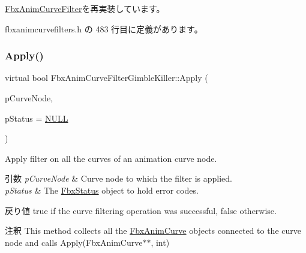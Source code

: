 \hyperlink{class_fbx_anim_curve_filter_a009498a65af4995bf5e5908f17837531}{Fbx\+Anim\+Curve\+Filter}を再実装しています。



 fbxanimcurvefilters.\+h の 483 行目に定義があります。

\mbox{\label{class_fbx_anim_curve_filter_gimble_killer_adb147695af2818ccc71e245170d05e78}} 
\subsubsection{\texorpdfstring{Apply()}{Apply()}\hspace{0.1cm}{\footnotesize\ttfamily [3/5]}}
{\footnotesize\ttfamily virtual bool Fbx\+Anim\+Curve\+Filter\+Gimble\+Killer\+::\+Apply (\begin{DoxyParamCaption}\item[{\hyperlink{class_fbx_anim_curve_node}{Fbx\+Anim\+Curve\+Node} \&}]{p\+Curve\+Node,  }\item[{\hyperlink{class_fbx_status}{Fbx\+Status} $\ast$}]{p\+Status = {\ttfamily \hyperlink{fbxarch_8h_a070d2ce7b6bb7e5c05602aa8c308d0c4}{N\+U\+LL}} }\end{DoxyParamCaption})\hspace{0.3cm}{\ttfamily [virtual]}}

Apply filter on all the curves of an animation curve node. 
\begin{DoxyParams}{引数}
{\em p\+Curve\+Node} & Curve node to which the filter is applied. \\
\hline
{\em p\+Status} & The \hyperlink{class_fbx_status}{Fbx\+Status} object to hold error codes. \\
\hline
\end{DoxyParams}
\begin{DoxyReturn}{戻り値}
{\ttfamily true} if the curve filtering operation was successful, {\ttfamily false} otherwise. 
\end{DoxyReturn}
\begin{DoxyRemark}{注釈}
This method collects all the \hyperlink{class_fbx_anim_curve}{Fbx\+Anim\+Curve} objects connected to the curve node and calls Apply(\+Fbx\+Anim\+Curve$\ast$$\ast$, int) 
\end{DoxyRemark}


